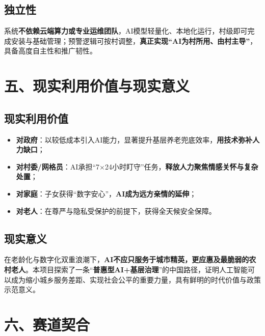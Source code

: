 \documentclass[
  letterpaper,
  DIV=11,
  numbers=noendperiod]{scrreprt}
\providecommand{\tightlist}{%
  \setlength{\itemsep}{0pt}\setlength{\parskip}{0pt}}
\begin{document}
\subsection{独立性}\label{ux72ecux7acbux6027}

系统\textbf{不依赖云端算力或专业运维团队}，AI模型轻量化、本地化运行，村级即可完成安装与基础管理；预警逻辑可按村调整，\textbf{真正实现``AI为村所用、由村主导''}，具备高度自主性和推广韧性。

\section{五、现实利用价值与现实意义}\label{ux4e94ux73b0ux5b9eux5229ux7528ux4ef7ux503cux4e0eux73b0ux5b9eux610fux4e49}

\subsection{现实利用价值}\label{ux73b0ux5b9eux5229ux7528ux4ef7ux503c}

\begin{itemize}
\tightlist
\item
  \textbf{对政府}：以较低成本引入AI能力，显著提升基层养老兜底效率，\textbf{用技术弥补人力缺口}；\\
\item
  \textbf{对村委/网格员}：AI承担``7×24小时盯守''任务，\textbf{释放人力聚焦情感关怀与复杂处置}；\\
\item
  \textbf{对家庭}：子女获得``数字安心''，\textbf{AI成为远方亲情的延伸}；\\
\item
  \textbf{对老人}：在尊严与隐私受保护的前提下，获得全天候安全保障。
\end{itemize}

\subsection{现实意义}\label{ux73b0ux5b9eux610fux4e49}

在老龄化与数字化双重浪潮下，\textbf{AI不应只服务于城市精英，更应惠及最脆弱的农村老人}。本项目探索了一条``\textbf{普惠型AI+基层治理}''的中国路径，证明人工智能可以成为缩小城乡服务差距、实现社会公平的重要力量，具有鲜明的时代价值与政策示范意义。

\section{六、赛道契合}\label{ux516dux8d5bux9053ux5951ux5408}
\end{document}
